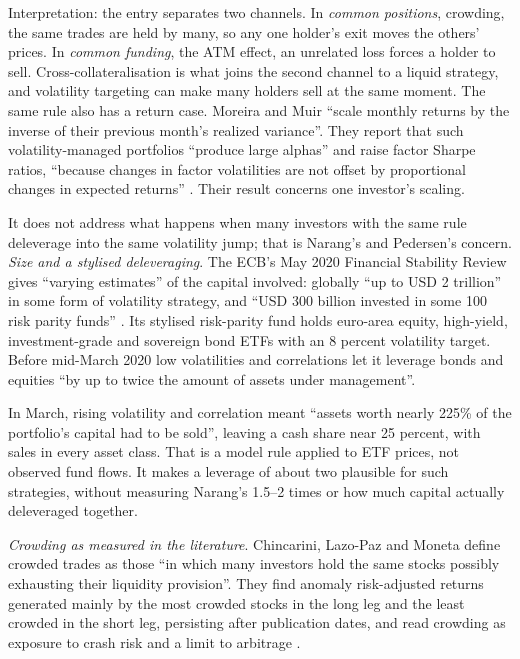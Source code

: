 \begin{qfdefinition}
 Interpretation: the entry separates two channels. In \emph{common positions}, crowding, the same trades are held by many, so any one holder's exit moves the others' prices. In \emph{common funding}, the ATM effect, an unrelated loss forces a holder to sell. Cross-collateralisation is what joins the second channel to a liquid strategy, and volatility targeting can make many holders sell at the same moment. The same rule also has a return case. Moreira and Muir ``scale monthly returns by the inverse of their previous month's realized variance''. They report that such volatility-managed portfolios ``produce large alphas'' and raise factor Sharpe ratios, ``because changes in factor volatilities are not offset by proportional changes in expected returns'' \citep[NBER WP~22208, abstract and p.~1]{s16-r25}. Their result concerns one investor's scaling.

It does not address what happens when many investors with the same rule deleverage into the same volatility jump; that is Narang's and Pedersen's concern. \emph{Size and a stylised deleveraging}. The ECB's May 2020 Financial Stability Review gives ``varying estimates'' of the capital involved: globally ``up to USD 2 trillion'' in some form of volatility strategy, and ``USD 300 billion invested in some 100 risk parity funds'' \citep[box ``Volatility-targeting strategies and the market sell-off'', May 2020]{ecb-fsr-2020-05-volbox}. Its stylised risk-parity fund holds euro-area equity, high-yield, investment-grade and sovereign bond ETFs with an 8 percent volatility target. Before mid-March 2020 low volatilities and correlations let it leverage bonds and equities ``by up to twice the amount of assets under management''.

In March, rising volatility and correlation meant ``assets worth nearly 225\% of the portfolio's capital had to be sold'', leaving a cash share near 25 percent, with sales in every asset class. That is a model rule applied to ETF prices, not observed fund flows. It makes a leverage of about two plausible for such strategies, without measuring Narang's 1.5--2 times or how much capital actually deleveraged together.

\emph{Crowding as measured in the literature}. Chincarini, Lazo-Paz and Moneta define crowded trades as those ``in which many investors hold the same stocks possibly exhausting their liquidity provision''. They find anomaly risk-adjusted returns generated mainly by the most crowded stocks in the long leg and the least crowded in the short leg, persisting after publication dates, and read crowding as exposure to crash risk and a limit to arbitrage \citep[abstract]{w4-chincarini-crowded-anomalies}.


\end{qfdefinition}
